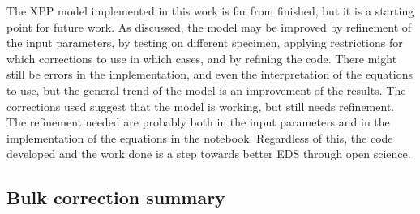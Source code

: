 The XPP model implemented in this work is far from finished, but it is a starting point for future work.
As discussed, the model may be improved by refinement of the input parameters, by testing on different specimen, applying restrictions for which corrections to use in which cases, and by refining the code.
There might still be errors in the implementation, and even the interpretation of the equations to use, but the general trend of the model is an improvement of the results.
The corrections used suggest that the model is working, but still needs refinement.
The refinement needed are probably both in the input parameters and in the implementation of the equations in the notebook.
Regardless of this, the code developed and the work done is a step towards better EDS through open science.



















\subsection{Bulk correction summary}
\label{discussion:quantitative:summary}








